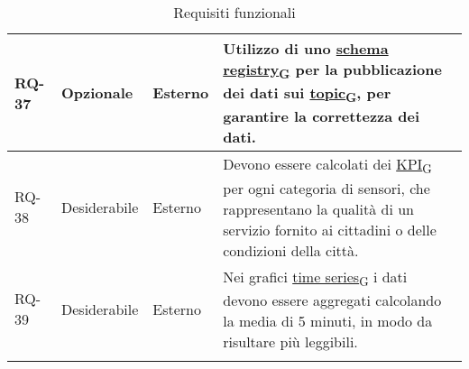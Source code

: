 \begin{longtable}{|>{\centering\arraybackslash}m{}|>{\centering\arraybackslash}m{}|>{\centering\arraybackslash}m{}|>{\centering\arraybackslash}m{}|}
	\\\hline
	RQ-37           & Opzionale           & Esterno        & Utilizzo di uno \href{https://7last.github.io/docs/rtb/documentazione-interna/glossario\#schema-registry}{schema registry\textsubscript{G}} per la pubblicazione dei dati sui \href{https://7last.github.io/docs/rtb/documentazione-interna/glossario\#topic}{topic\textsubscript{G}}, per garantire la correttezza dei dati.
	\\\hline
	RQ-38           & Desiderabile        & Esterno        & Devono essere calcolati dei \href{https://7last.github.io/docs/rtb/documentazione-interna/glossario\#key-performance-indicator}{KPI\textsubscript{G}} per ogni categoria di sensori, che rappresentano la qualità di un servizio fornito ai cittadini o delle condizioni della città.
	\\\hline
	RQ-39           & Desiderabile        & Esterno        & Nei grafici \href{https://7last.github.io/docs/rtb/documentazione-interna/glossario\#time-series}{time series\textsubscript{G}} i dati devono essere aggregati calcolando la media di 5 minuti, in modo da risultare più leggibili.
	\\\hline
	\caption{Requisiti funzionali}
\end{longtable}

